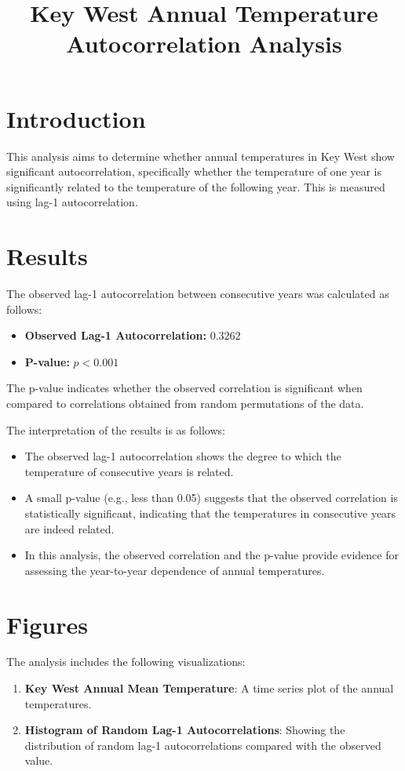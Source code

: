 \documentclass[a4paper,12pt]{article}
\title{Key West Annual Temperature Autocorrelation Analysis}
\author{}
\date{}
\begin{document}
\maketitle

\section*{Introduction}
This analysis aims to determine whether annual temperatures in Key West show significant autocorrelation, specifically whether the temperature of one year is significantly related to the temperature of the following year. This is measured using lag-1 autocorrelation.

\section*{Results}
The observed lag-1 autocorrelation between consecutive years was calculated as follows:

\begin{itemize}
    \item \textbf{Observed Lag-1 Autocorrelation:} $0.3262$  %
    \item \textbf{P-value:} $p < 0.001$ %
\end{itemize}

The p-value indicates whether the observed correlation is significant when compared to correlations obtained from random permutations of the data.

\vspace{0.5cm}
\noindent The interpretation of the results is as follows:
\begin{itemize}
    \item The observed lag-1 autocorrelation shows the degree to which the temperature of consecutive years is related.
    \item A small p-value (e.g., less than 0.05) suggests that the observed correlation is statistically significant, indicating that the temperatures in consecutive years are indeed related.
    \item In this analysis, the observed correlation and the p-value provide evidence for assessing the year-to-year dependence of annual temperatures.
\end{itemize}

\section*{Figures}
The analysis includes the following visualizations:
\begin{enumerate}
    \item \textbf{Key West Annual Mean Temperature}: A time series plot of the annual temperatures.
\item \textbf{Histogram of Random Lag-1 Autocorrelations}: Showing the distribution of random lag-1 autocorrelations compared with the observed value.
\end{enumerate}
\end{document}
